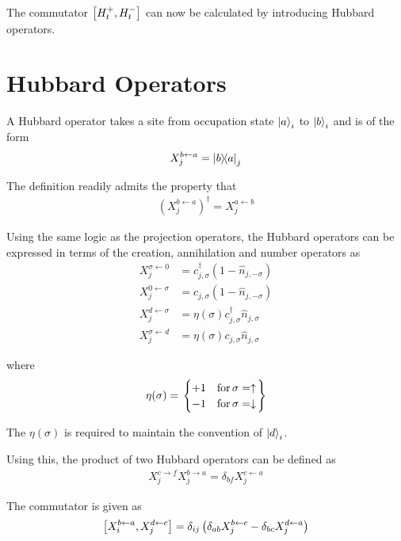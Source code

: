 \documentclass[]{report}
\begin{document}
The commutator $ \comm{H^{+}_{t}}{H^{-}_{t}} $ can now be calculated by introducing Hubbard operators.

\section{Hubbard Operators}
A Hubbard operator takes a site from occupation state $ \ket{a}_i $ to $ \ket{b}_i $ and is of the form
\begin{align}
X^{b \leftarrow a}_{j} = \op{b}{a}_j
\end{align}

The definition readily admits the property that
\begin{align}
\left( X^{b \leftarrow a}_{j}\right) ^{\dagger} = X^{a \leftarrow b}_{j}
\end{align}

Using the same logic as the projection operators, the Hubbard operators can be expressed in terms of the creation, annihilation and number operators as
\begin{align}
X^{\sigma \leftarrow 0}_{j} &= c^{\dagger}_{j, \sigma} (1 - \hat{n}_{j, -\sigma})\\
X^{0 \leftarrow \sigma}_{j} &= c_{j, \sigma} (1 - \hat{n}_{j, -\sigma})\\
X^{d \leftarrow \sigma}_{j} &= \eta(\sigma) c^{\dagger}_{j, \sigma} \hat{n}_{j, \sigma} \\
X^{\sigma \leftarrow d}_{j} &= \eta(\sigma) c_{j, \sigma} \hat{n}_{j, \sigma}
\end{align}

where
\begin{align}
\eta(\sigma) = \left.
\begin{cases}
+1 & \text{for\,} \sigma = \uparrow\\
-1 & \text{for\,} \sigma = \downarrow\\
\end{cases}
\right\}
\end{align}

The $ \eta(\sigma) $ is required to maintain the convention of $ \ket{d}_i $.

Using this, the product of two Hubbard operators can be defined as
\begin{align}
X^{c \rightarrow f}_{j} X^{b \rightarrow a}_{j} = \delta_{bf} X^{c \leftarrow a}_{j}
\end{align}

The commutator is given as
\begin{align}
\comm{X^{b \leftarrow a}_{i}}{X^{d \leftarrow c}_{j}} = \delta_{ij} \left( \delta_{ab} X^{b \leftarrow c}_{j} - \delta_{bc} X^{d \leftarrow a}_{j} \right)
\end{align}
\end{document}
